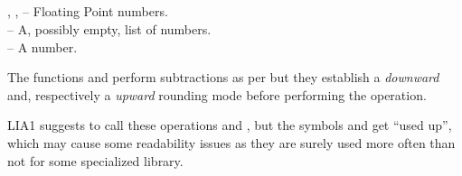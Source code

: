\documentclass[../Arithmetic-Operations.tex]{subfiles}
\begin{document}


   \RArrow {}\\
   \RArrow {}\\
   \RArrow \varname {}\\
   \RArrow \varname {}\\

\DArgsNValues{}

, ,  -- Floating Point numbers.\\
 -- A, possibly empty, list of numbers.\\
 -- A number.

\DDescription{}

The functions   and  perform subtractions as per \code{-}
but they establish a \emph{downward} and, respectively a
\emph{upward} rounding mode before performing the operation.

\DNotes{}

LIA1 suggests to call these operations \code{<-} and \code{->}, but the symbols \code{<-}
and \code{->} get ``used up'', which may cause some readability issues
as they are surely used more often than not for some specialized
library.
\end{document}
